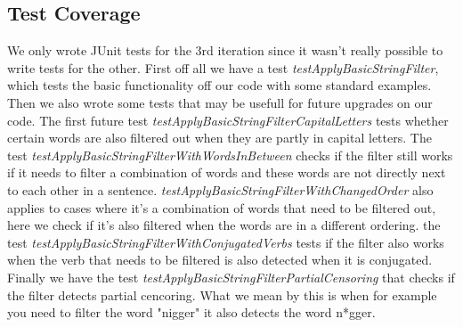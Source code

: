 \subsection{Test Coverage}
We only wrote JUnit tests for the 3rd iteration since it wasn't really possible to write tests for the other.
First off all we have a test \textit{testApplyBasicStringFilter}, which tests the basic functionality off our code with some standard examples. 
Then we also wrote some tests that may be usefull for future upgrades on our code.
The first future test \textit{testApplyBasicStringFilterCapitalLetters} tests whether certain words 
are also filtered out when they are partly in capital letters. 
The test \textit{testApplyBasicStringFilterWithWordsInBetween} checks if the filter still works if 
it needs to filter a combination of words and these words are not directly next to each other in a sentence.
\textit{testApplyBasicStringFilterWithChangedOrder} also applies to cases where it's a combination of
words that need to be filtered out, here we check if it's also filtered when the words are in a different 
ordering.
the test \textit{testApplyBasicStringFilterWithConjugatedVerbs} tests if the filter also works when the 
verb that needs to be filtered is also detected when it is conjugated.
Finally we have the test \textit{testApplyBasicStringFilterPartialCensoring} that checks if the filter detects 
partial cencoring. What we mean by this is when for example you need to filter the word "nigger" it also
detects the word n*gger.
